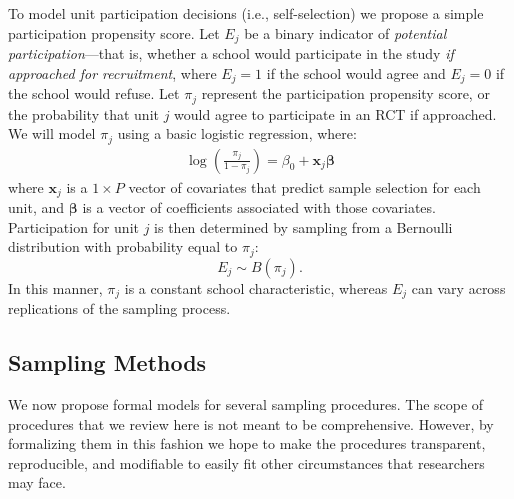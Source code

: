 \documentclass[
  english,
  man,floatsintext]{apa6}
\begin{document}
To model unit participation decisions (i.e., self-selection) we propose a simple participation propensity score. Let \(E_j\) be a binary indicator of \emph{potential participation}---that is, whether a school would participate in the study \emph{if approached for recruitment}, where \(E_j = 1\) if the school would agree and \(E_j = 0\) if the school would refuse. Let \(\pi_j\) represent the participation propensity score, or the probability that unit \(j\) would agree to participate in an RCT if approached. We will model \(\pi_j\) using a basic logistic regression, where:
\begin{align} 
\label{eq:RGM}
\log\left(\frac{\pi_j}{1 - \pi_j}\right) = \beta_0 + \mathbf{x}_j \boldsymbol\beta
\end{align}
where \(\mathbf{x}_j\) is a \(1\times P\) vector of covariates that predict sample selection for each unit, and \(\boldsymbol\beta\) is a vector of coefficients associated with those covariates. Participation for unit \(j\) is then determined by sampling from a Bernoulli distribution with probability equal to \(\pi_j\):
\begin{equation}
\label{eq:Ej}
E_j \sim B(\pi_j).
\end{equation}
In this manner, \(\pi_j\) is a constant school characteristic, whereas \(E_j\) can vary across replications of the sampling process.

\hypertarget{sampling-methods}{%
\subsection{Sampling Methods}\label{sampling-methods}}

We now propose formal models for several sampling procedures. The scope of procedures that we review here is not meant to be comprehensive. However, by formalizing them in this fashion we hope to make the procedures transparent, reproducible, and modifiable to easily fit other circumstances that researchers may face.
\end{document}
